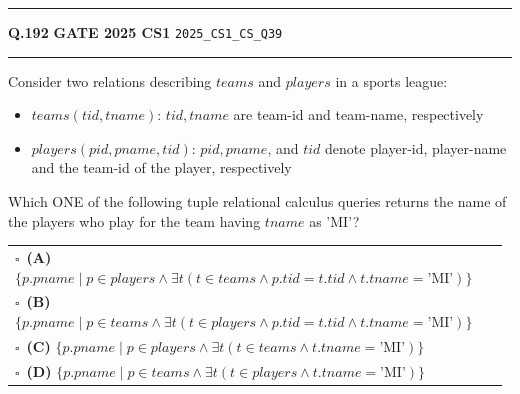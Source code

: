 \documentclass[a4paper,10pt]{article}
\begin{document}
\vspace{6pt}\hrule height 0.35pt\vspace{6pt}
\noindent
\begin{tcolorbox}[
    blanker,
    sidebyside,
    sidebyside align=top,
    lefthand width=0.55\textwidth,
    top=4pt, bottom=4pt, left=0pt, right=0pt,
    middle=16pt,
    underlay={
        \draw[dashed, black!80, line width=0.8pt, dash pattern=on 4pt off 3pt]
            ([xshift=0.55\textwidth+8pt]frame.north west) --
            ([xshift=0.55\textwidth+8pt]frame.south west);
    }
]
\textbf{Q.192}  \hfill {\footnotesize\textbf{GATE 2025 CS1} \quad \tiny\texttt{2025\_CS1\_CS\_Q39}}
\vspace{2pt}\hrule height 0.3pt\vspace{4pt}

Consider two relations describing $teams$ and $players$ in a sports league:
\begin{itemize}
\item $teams(tid, tname)$: $tid, tname$ are team-id and team-name, respectively
\item $players(pid, pname, tid)$: $pid, pname$, and $tid$ denote player-id, player-name and the team-id of the player, respectively
\end{itemize}
Which ONE of the following tuple relational calculus queries returns the name of the players who play for the team having $tname$ as 'MI'?

\par\vspace{6pt}\noindent
\begin{tabular}{@{}p{0.98\linewidth}@{}}
$\square$\ \textbf{(A)} $\{ p.pname \mid p \in players \land \exists t (t \in teams \land p.tid = t.tid \land t.tname = \text{'MI'}) \}$ \\
\addlinespace[3pt]
$\square$\ \textbf{(B)} $\{ p.pname \mid p \in teams \land \exists t (t \in players \land p.tid = t.tid \land t.tname = \text{'MI'}) \}$ \\
\addlinespace[3pt]
$\square$\ \textbf{(C)} $\{ p.pname \mid p \in players \land \exists t (t \in teams \land t.tname = \text{'MI'}) \}$ \\
\addlinespace[3pt]
$\square$\ \textbf{(D)} $\{ p.pname \mid p \in teams \land \exists t (t \in players \land t.tname = \text{'MI'}) \}$
\end{tabular}

\tcblower


\end{tcolorbox}
\end{document}
